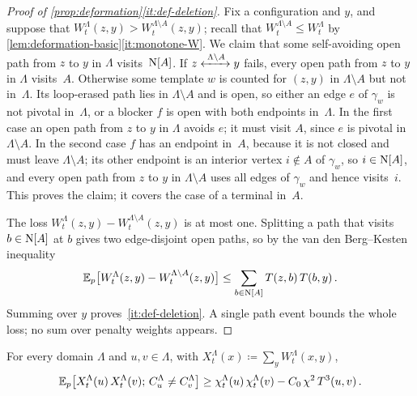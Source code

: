 \begin{proof}[Proof of \cref{prop:deformation}\ref{it:def-deletion}]
Fix a configuration and $y$, and suppose that $W^\Lambda_t(z,y)>W^{\Lambda\setminus A}_t(z,y)$; recall
that $W^{\Lambda\setminus A}_t\le W^\Lambda_t$ by \cref{lem:deformation-basic}\ref{it:monotone-W}. We
claim that some self-avoiding open path from $z$ to $y$ in $\Lambda$ visits~$\mathrm{N}[A]$. If
$z\xleftrightarrow{\;\Lambda\setminus A\;}y$ fails, every open path from $z$ to $y$ in $\Lambda$ visits~$A$.
Otherwise some template $w$ is counted for $(z,y)$ in $\Lambda\setminus A$ but not in~$\Lambda$. Its
loop-erased path lies in $\Lambda\setminus A$ and is open, so either an edge $e$ of $\gamma_w$ is not
pivotal in~$\Lambda$, or a blocker $f$ is open with both endpoints in~$\Lambda$. In the first case an
open path from $z$ to $y$ in $\Lambda$ avoids $e$; it must visit $A$, since $e$ is pivotal in
$\Lambda\setminus A$. In the second case $f$ has an endpoint in~$A$, because it is not closed and must
leave $\Lambda\setminus A$; its other endpoint is an interior vertex $i\notin A$ of $\gamma_w$, so
$i\in\mathrm{N}[A]$, and every open path from $z$ to $y$ in $\Lambda\setminus A$ uses all edges of $\gamma_w$
and hence visits~$i$. This proves the claim; it covers the case of a terminal in~$A$.

The loss $W^\Lambda_t(z,y)-W^{\Lambda\setminus A}_t(z,y)$ is at most one. Splitting a path that visits
$b\in\mathrm{N}[A]$ at $b$ gives two edge-disjoint open paths, so by the van den Berg--Kesten inequality
\begin{equation*}
  \mathbb E_p\bigl[W^\Lambda_t(z,y)-W^{\Lambda\setminus A}_t(z,y)\bigr]\le\sum_{b\in\mathrm{N}[A]}T(z,b)\,T(b,y)\,.
\end{equation*}
Summing over $y$ proves~\ref{it:def-deletion}. A single path event bounds the whole loss; no sum over
penalty weights appears.
\end{proof}

\begin{lemma}\label{lem:two-clusters}
For every domain $\Lambda$ and $u,v\in\Lambda$, with $X^\Lambda_t(x)\coloneqq\sum_yW^\Lambda_t(x,y)$,
\begin{equation}\label{eq:two-clusters}
  \mathbb E_p\bigl[X^\Lambda_t(u)\,X^\Lambda_t(v);\,C^\Lambda_u\neq C^\Lambda_v\bigr]
  \ge\chi^\Lambda_t(u)\,\chi^\Lambda_t(v)-C_0\,\chi^2\,T^3(u,v)\,.
\end{equation}
\end{lemma}

